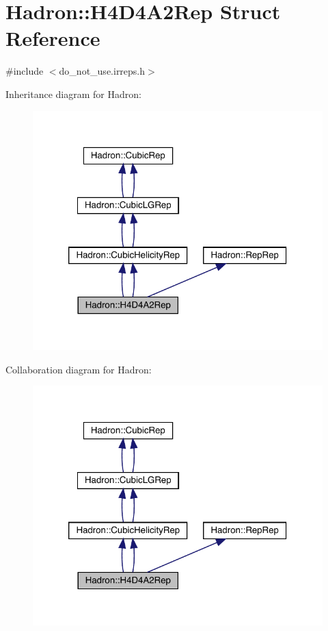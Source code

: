 \hypertarget{structHadron_1_1H4D4A2Rep}{}\section{Hadron\+:\+:H4\+D4\+A2\+Rep Struct Reference}
\label{structHadron_1_1H4D4A2Rep}


{\ttfamily \#include $<$do\+\_\+not\+\_\+use.\+irreps.\+h$>$}



Inheritance diagram for Hadron\+:\nopagebreak
\begin{figure}[H]
\begin{center}
\leavevmode
\includegraphics[width=320pt]{d0/d9c/structHadron_1_1H4D4A2Rep__inherit__graph}
\end{center}
\end{figure}


Collaboration diagram for Hadron\+:\nopagebreak
\begin{figure}[H]
\begin{center}
\leavevmode
\includegraphics[width=320pt]{d3/d30/structHadron_1_1H4D4A2Rep__coll__graph}
\end{center}
\end{figure}
